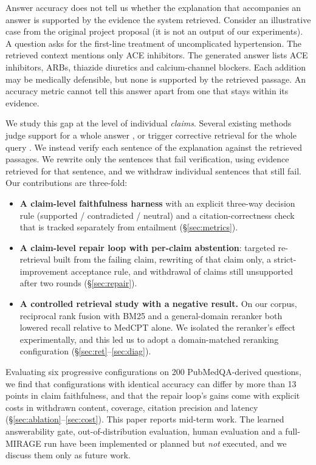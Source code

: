 \documentclass[11pt]{article}
\begin{document}
Answer accuracy does not tell us whether the explanation that accompanies an answer is supported by the evidence the system retrieved. Consider an illustrative case from the original project proposal (it is not an output of our experiments). A question asks for the first-line treatment of uncomplicated hypertension. The retrieved context mentions only ACE inhibitors. The generated answer lists ACE inhibitors, ARBs, thiazide diuretics and calcium-channel blockers. Each addition may be medically defensible, but none is supported by the retrieved passage. An accuracy metric cannot tell this answer apart from one that stays within its evidence.

We study this gap at the level of individual \emph{claims}. Several existing methods judge support for a whole answer \citep{asai2024selfrag}, or trigger corrective retrieval for the whole query \citep{yan2024crag}. We instead verify each sentence of the explanation against the retrieved passages. We rewrite only the sentences that fail verification, using evidence retrieved for that sentence, and we withdraw individual sentences that still fail. Our contributions are three-fold:
\begin{itemize}
\item \textbf{A claim-level faithfulness harness} with an explicit three-way decision rule (supported / contradicted / neutral) and a citation-correctness check that is tracked separately from entailment (\S\ref{sec:metrics}).
\item \textbf{A claim-level repair loop with per-claim abstention}: targeted re-retrieval built from the failing claim, rewriting of that claim only, a strict-improvement acceptance rule, and withdrawal of claims still unsupported after two rounds (\S\ref{sec:repair}).
\item \textbf{A controlled retrieval study with a negative result.} On our corpus, reciprocal rank fusion with BM25 and a general-domain reranker both lowered recall relative to MedCPT alone. We isolated the reranker's effect experimentally, and this led us to adopt a domain-matched reranking configuration (\S\ref{sec:ret}--\ref{sec:diag}).
\end{itemize}
Evaluating six progressive configurations on 200 PubMedQA-derived questions, we find that configurations with identical accuracy can differ by more than 13 points in claim faithfulness, and that the repair loop's gains come with explicit costs in withdrawn content, coverage, citation precision and latency (\S\ref{sec:ablation}--\ref{sec:cost}). This paper reports mid-term work. The learned answerability gate, out-of-distribution evaluation, human evaluation and a full-MIRAGE run have been implemented or planned but \emph{not} executed, and we discuss them only as future work.
\end{document}
